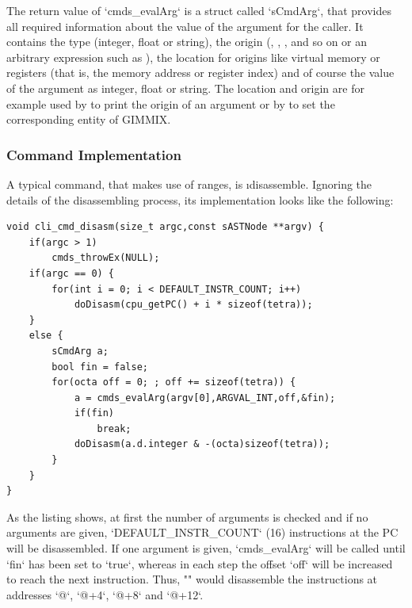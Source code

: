 The return value of `cmds_evalArg` is a struct called `sCmdArg`, that provides all required information about the value of the argument for the caller. It contains the type (integer, float or string), the origin (, , \gcmd{\$}, and so on or an arbitrary expression such as ), the location for origins like virtual memory or registers (that is, the memory address or register index) and of course the value of the argument as integer, float or string. The location and origin are for example used by  to print the origin of an argument or by  to set the corresponding entity of GIMMIX.

\subsubsection{Command Implementation}

A typical command, that makes use of ranges, is \i{disassemble}. Ignoring the details of the disassembling process, its implementation looks like the following:
\begin{lstlisting}[language=GIMMIXC,caption={Implementation of command \gcmd{d}}]
void cli_cmd_disasm(size_t argc,const sASTNode **argv) {
	if(argc > 1)
		cmds_throwEx(NULL);
	if(argc == 0) {
		for(int i = 0; i < DEFAULT_INSTR_COUNT; i++)
			doDisasm(cpu_getPC() + i * sizeof(tetra));
	}
	else {
		sCmdArg a;
		bool fin = false;
		for(octa off = 0; ; off += sizeof(tetra)) {
			a = cmds_evalArg(argv[0],ARGVAL_INT,off,&fin);
			if(fin)
				break;
			doDisasm(a.d.integer & -(octa)sizeof(tetra));
		}
	}
}
\end{lstlisting}
As the listing shows, at first the number of arguments is checked and if no arguments are given, `DEFAULT_INSTR_COUNT` (16) instructions at the PC will be disassembled. If one argument is given, `cmds_evalArg` will be called until `fin` has been set to `true`, whereas in each step the offset `off` will be increased to reach the next instruction. Thus, "" would disassemble the instructions at addresses `@`, `@+4`, `@+8` and `@+12`.

